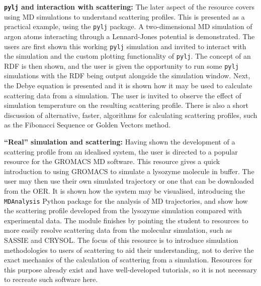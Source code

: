 \textbf{\texttt{pylj} and interaction with scattering:} The later aspect of the resource covers using MD simulations to understand scattering profiles.
This is presented as a practical example, using the \texttt{pylj} package.\autocite{mccluskey_pylj_2018,mccluskey_arm61/pylj_2019-2}
A two-dimensional MD simulation of argon atoms interacting through a Lennard-Jones potential is demonstrated.
The users are first shown this working \texttt{pylj} simulation and invited to interact with the simulation and the custom plotting functionality of \texttt{pylj}.
The concept of an RDF is then shown, and the user is given the opportunity to run some \texttt{pylj} simulations with the RDF being output alongside the simulation window.
Next, the Debye equation\autocite{debye_zerstreuung_1915} is presented and it is shown how it may be used to calculate scattering data from a simulation.
The user is invited to observe the effect of simulation temperature on the resulting scattering profile.
There is also a short discussion of alternative, faster, algorithms for calculating scattering profiles, such as the Fibonacci Sequence or Golden Vectors method.\autocite{watson_rapid_2013,svergun_solution_1994}

\textbf{``Real'' simulation and scattering:} Having shown the development of a scattering profile from an idealised system, the user is directed to a popular resource for the GROMACS\autocite{berendsen_gromacs_1995} MD software.
This resource gives a quick introduction to using GROMACS to simulate a lysozyme molecule in buffer.\autocite{lemkul_gromacs_nodate}
The user may then use their own simulated trajectory or one that can be downloaded from the OER.
It is shown how the system may be visualised, introducing the \texttt{MDAnalysis} Python package for the analysis of MD trajectories,\autocite{michaud-agrawal_mdanalysis_2011,gowers_mdanalysis_2016} and show how the scattering profile developed from the lysozyme simulation compared with experimental data.\autocite{franke_correlation_2015}
The module finishes by pointing the student to resources to more easily resolve scattering data from the molecular simulation, such as SASSIE and CRYSOL.\autocite{perkins_atomistic_2016,svergun_crysol_1995}
The focus of this resource is to introduce simulation methodologies to users of scattering to aid their understanding, not to derive the exact mechanics of the calculation of scattering from a simulation.
Resources for this purpose already exist and have well-developed tutorials, so it is not necessary to recreate such software here.

